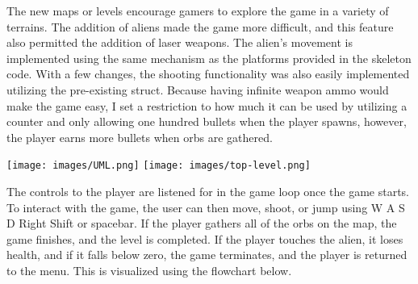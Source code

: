 The new maps or levels encourage gamers to explore the game in a variety of terrains. The addition of aliens made the game more difficult, and this feature also permitted the addition of laser weapons. The alien's movement is implemented using the same mechanism as the platforms provided in the skeleton code. With a few changes, the shooting functionality was also easily implemented utilizing the pre-existing struct. Because having infinite weapon ammo would make the game easy, I set a restriction to how much it can be used by utilizing a counter and only allowing one hundred bullets when the player spawns, however, the player earns more bullets when orbs are gathered.

\texttt{[image: images/UML.png]}
\texttt{[image: images/top-level.png]}

The controls to the player are listened for in the game loop once the game starts. To interact with the game, the user can then move, shoot, or jump using W A S D Right Shift or spacebar. If the player gathers all of the orbs on the map, the game finishes, and the level is completed. If the player touches the alien, it loses health, and if it falls below zero, the game terminates, and the player is returned to the menu. This is visualized using the flowchart below.
